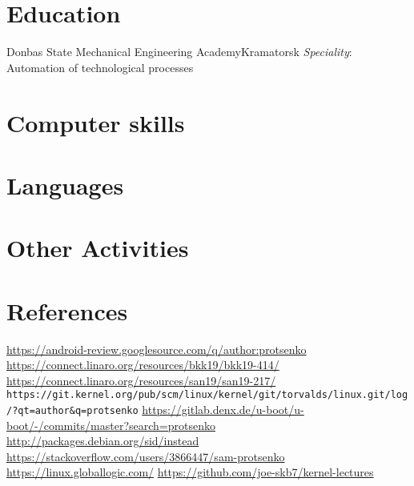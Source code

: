 \documentclass[11pt,a4paper]{moderncv}
\begin{document}
\section{Education}
  {Donbas State Mechanical Engineering Academy}{Kramatorsk}{}
  {\textit{Speciality}: Automation of technological processes}

\section{Computer skills}

\section{Languages}

\pagebreak

\section{Other Activities}


\section{References}

\begin{thebibliography}{9}
 \color{web} \url{https://android-review.googlesource.com/q/author:protsenko}
 \color{web} \url{https://connect.linaro.org/resources/bkk19/bkk19-414/}
 \color{web} \url{https://connect.linaro.org/resources/san19/san19-217/}
 \color{web} \nolinkurl{https://git.kernel.org/pub/scm/linux/kernel/git/torvalds/linux.git/log/?qt=author&q=protsenko}
 \color{web} \url{https://gitlab.denx.de/u-boot/u-boot/-/commits/master?search=protsenko}
 \color{web} \url{http://packages.debian.org/sid/instead}
 \color{web} \url{https://stackoverflow.com/users/3866447/sam-protsenko}
 \color{web} \url{https://linux.globallogic.com/}
 \color{web} \url{https://github.com/joe-skb7/kernel-lectures}
\end{thebibliography}
\end{document}
